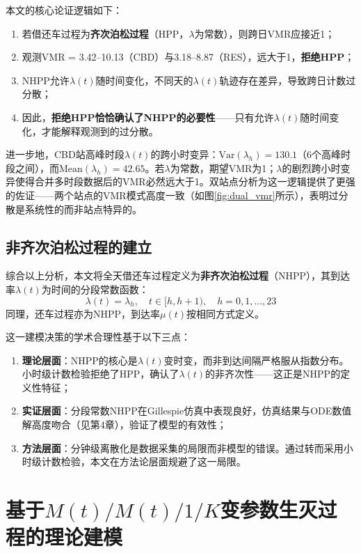 \documentclass[12pt,a4paper]{article}
\begin{document}
本文的核心论证逻辑如下：
\begin{enumerate}
    \item 若借还车过程为\textbf{齐次泊松过程}（HPP，$\lambda$为常数），则跨日VMR应接近1；
    \item 观测VMR = 3.42--10.13（CBD）与3.18--8.87（RES），远大于1，\textbf{拒绝HPP}；
    \item NHPP允许$\lambda(t)$随时间变化，不同天的$\lambda(t)$轨迹存在差异，导致跨日计数过分散；
    \item 因此，\textbf{拒绝HPP恰恰确认了NHPP的必要性}——只有允许$\lambda(t)$随时间变化，才能解释观测到的过分散。
\end{enumerate}

进一步地，CBD站高峰时段$\lambda(t)$的跨小时变异：$\text{Var}(\lambda_h) = 130.1$（6个高峰时段之间），而$\text{Mean}(\lambda_h) = 42.65$。若$\lambda$为常数，期望VMR为1；$\lambda$的剧烈跨小时变异使得合并多时段数据后的VMR必然远大于1。双站点分析为这一逻辑提供了更强的佐证——两个站点的VMR模式高度一致（如图\ref{fig:dual_vmr}所示），表明过分散是系统性的而非站点特异的。

\subsection{非齐次泊松过程的建立}

综合以上分析，本文将全天借还车过程定义为\textbf{非齐次泊松过程}（NHPP），其到达率$\lambda(t)$为时间的分段常数函数：
\begin{equation}
\lambda(t) = \lambda_h, \quad t \in [h, h+1), \quad h = 0, 1, \ldots, 23
\end{equation}
同理，还车过程亦为NHPP，到达率$\mu(t)$按相同方式定义。

这一建模决策的学术合理性基于以下三点：
\begin{enumerate}
    \item \textbf{理论层面}：NHPP的核心是$\lambda(t)$变时变，而非到达间隔严格服从指数分布。小时级计数检验拒绝了HPP，确认了$\lambda(t)$的非齐次性——这正是NHPP的定义性特征；
    \item \textbf{实证层面}：分段常数NHPP在Gillespie仿真中表现良好，仿真结果与ODE数值解高度吻合（见第4章），验证了模型的有效性；
    \item \textbf{方法层面}：分钟级离散化是数据采集的局限而非模型的错误。通过转而采用小时级计数检验，本文在方法论层面规避了这一局限。
\end{enumerate}

\section{基于$M(t)/M(t)/1/K$变参数生灭过程的理论建模}
\end{document}
